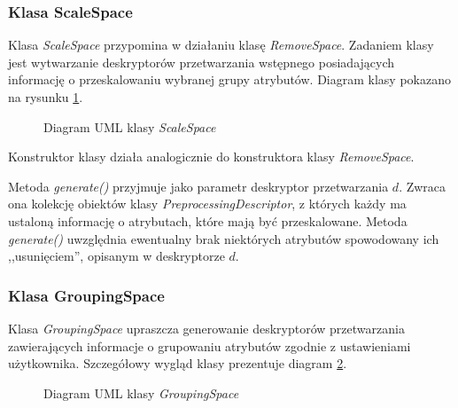 \documentclass[../thesis.tex]{subfiles}
\begin{document}
\subsubsection{Klasa ScaleSpace}

Klasa \emph{ScaleSpace} przypomina w działaniu klasę \emph{RemoveSpace}. Zadaniem klasy jest wytwarzanie deskryptorów przetwarzania wstępnego posiadających informację o przeskalowaniu wybranej grupy atrybutów. Diagram klasy pokazano na rysunku \ref{proj:diagram_scale_space}.

\begin{figure}[h]
\centering
{}
\caption{Diagram UML klasy \emph{ScaleSpace}}
\label{proj:diagram_scale_space}
\end{figure}

Konstruktor klasy działa analogicznie do konstruktora klasy \emph{RemoveSpace}. 

Metoda \emph{generate()} przyjmuje jako parametr deskryptor przetwarzania $d$. Zwraca ona kolekcję obiektów klasy \emph{PreprocessingDescriptor}, z których każdy ma ustaloną informację o atrybutach, które mają być przeskalowane. Metoda \emph{generate()} uwzględnia ewentualny brak niektórych atrybutów spowodowany ich ,,usunięciem'', opisanym w deskryptorze $d$.

\subsubsection{Klasa GroupingSpace}

Klasa \emph{GroupingSpace} upraszcza generowanie deskryptorów przetwarzania zawierających informacje o grupowaniu atrybutów zgodnie z ustawieniami użytkownika. Szczegółowy wygląd klasy prezentuje diagram \ref{proj:diagram_grouping_space}.

\begin{figure}[h]
\centering
{}
\caption{Diagram UML klasy \emph{GroupingSpace}}
\label{proj:diagram_grouping_space}
\end{figure}
\end{document}
